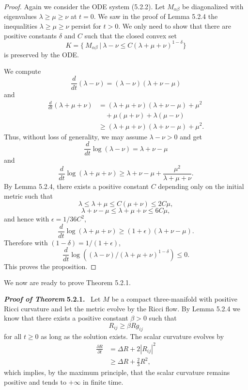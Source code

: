 \begin{proof}
Again we consider the ODE system (5.2.2). Let $M_{\alpha\beta}$ be
diagonalized with eigenvalues $\lambda \ge \mu \ge \nu$ at $t=0$.
We saw in the proof of Lemma 5.2.4 the inequalities $\lambda \ge
\mu \ge \nu$ persist for $t>0$. We only need to show that there
are positive constants $\delta$ and $C$ such that the closed
convex set
$$
K=\{\ M_{\alpha\beta}\ |\ \lambda-\nu\leq
C(\lambda+\mu+\nu)^{1-\delta}\}
$$
is preserved by the ODE.

We compute
$$
\frac{d}{dt}(\lambda-\nu)=(\lambda-\nu)(\lambda+\nu-\mu)
$$
and
\begin{displaymath}
\begin{split}
   \frac{d}{dt}(\lambda+\mu+\nu)
& = (\lambda+\mu+\nu)(\lambda+\nu-\mu)+\mu^2\\[2mm]
&\quad  +\mu(\mu+\nu)+\lambda(\mu-\nu)\\[2mm]
& \geq (\lambda+\mu+\nu)(\lambda+\nu-\mu)+\mu^2.
\end{split}
\end{displaymath}
Thus, without loss of generality, we may assume $\lambda-\nu>0$
and get
$$
\frac{d}{dt}\log(\lambda-\nu)=\lambda+\nu-\mu
$$
and
$$
\frac{d}{dt}\log(\lambda+\mu+\nu)\geq
\lambda+\nu-\mu+\frac{\mu^2}{\lambda+\mu+\nu}.
$$
By Lemma 5.2.4, there exists a positive constant $C$ depending
only on the initial metric such that
$$
\lambda\leq \lambda+\mu\leq C(\mu+\nu)\leq 2C\mu,
$$
$$
\lambda+\nu-\mu\leq \lambda+\mu+\nu\leq 6C\mu,
$$
and hence with $\epsilon={1}/{36C^2}$,
$$
\frac{d}{dt}\log(\lambda+\mu+\nu)\geq(1+\epsilon)(\lambda+\nu-\mu).
$$
Therefore with $(1-\delta)={1}/{(1+\epsilon)}$,
$$
\frac{d}{dt}\log((\lambda-\nu)/(\lambda+\mu+\nu)^{1-\delta})\leq0.
$$
This proves the proposition.
\end{proof}

We now are ready to prove Theorem 5.2.1.

\medskip
{\bf\em Proof of Theorem} {\bf 5.2.1.} \ Let $M$ be a compact
three-manifold with positive Ricci curvature and let the metric
evolve by the Ricci flow. By Lemma 5.2.4 we know that there exists
a positive constant $\beta>0$ such that
$$
R_{ij}\ge \beta Rg_{ij}
$$
for all $t\ge 0$ as long as the solution exists. The scalar
curvature evolves by
\begin{align*}
\frac{\partial R}{\partial t}&  = \Delta R+2|R_{ij}|^2\\
&  \ge \Delta R+\frac{2}{3}R^2,
\end{align*}
which implies, by the maximum principle, that the scalar curvature
remains positive and tends to $+\infty$ in finite time.

